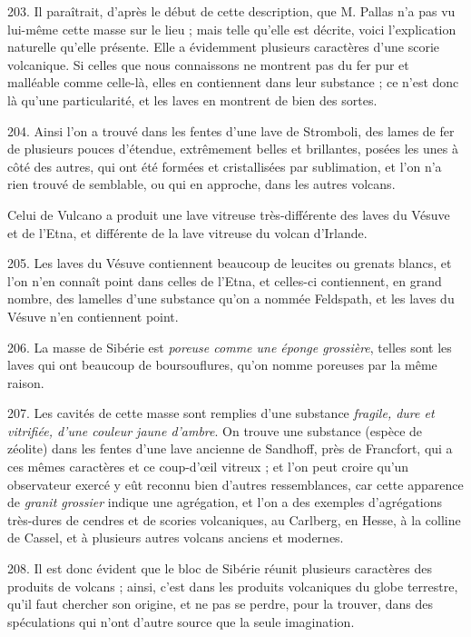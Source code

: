 \documentclass[a4paper, 11pt, oneside, polutonikogreek, french]{article}
\begin{document}
203. Il paraîtrait, d'après le début de cette description, que M. Pallas n'a pas vu lui-même cette masse sur le lieu ; mais telle qu'elle est décrite, voici l'explication naturelle qu'elle présente. Elle a évidemment plusieurs caractères d'une scorie volcanique. Si celles que nous connaissons ne montrent pas du fer pur et malléable comme celle-là, elles en contiennent dans leur substance ; ce n'est donc là qu'une particularité, et les laves en montrent de bien des sortes.

204. Ainsi l'on a trouvé dans les fentes d'une lave de Stromboli, des lames de fer de plusieurs pouces d'étendue, extrêmement belles et brillantes, posées les unes à côté des autres, qui ont été formées et cristallisées par sublimation, et l'on n'a rien trouvé de semblable, ou qui en approche, dans les autres volcans.

Celui de Vulcano a produit une lave vitreuse très-différente des laves du Vésuve et de l'Etna, et différente de la lave vitreuse du volcan d'Irlande.

205. Les laves du Vésuve contiennent beaucoup de leucites ou grenats blancs, et l'on n'en connaît point dans celles de l'Etna, et celles-ci contiennent, en grand nombre, des lamelles d'une substance qu'on a nommée Feldspath, et les laves du Vésuve n'en contiennent point.

206. La masse de Sibérie est \emph{poreuse comme une éponge grossière}, telles sont les laves qui ont beaucoup de boursouflures, qu'on nomme poreuses par la même raison.

207. Les cavités de cette masse sont remplies d'une substance \emph{fragile, dure et vitrifiée, d'une couleur jaune d'ambre}. On trouve une substance (espèce de zéolite) dans les fentes d'une lave ancienne de Sandhoff, près de Francfort, qui a ces mêmes caractères et ce coup-d'œil vitreux ; et l'on peut croire qu'un observateur exercé y eût reconnu bien d'autres ressemblances, car cette apparence de \emph{granit grossier} indique une agrégation, et l'on a des exemples d'agrégations très-dures de cendres et de scories volcaniques, au Carlberg, en Hesse, à la colline de Cassel, et à plusieurs autres volcans anciens et modernes.

208. Il est donc évident que le bloc de Sibérie réunit plusieurs caractères des produits de volcans ; ainsi, c'est dans les produits volcaniques du globe terrestre, qu'il faut chercher son origine, et ne pas se perdre, pour la trouver, dans des spéculations qui n'ont d'autre source que la seule imagination.
\end{document}
